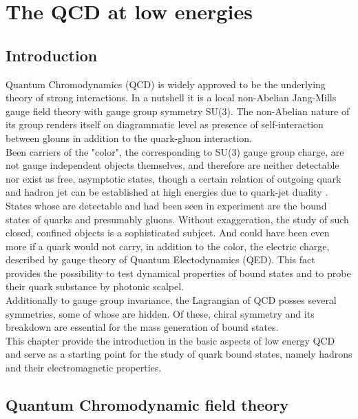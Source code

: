 \chapter{The QCD at low energies}
\label{chap:QCD_low}

\section{Introduction}
Quantum Chromodynamics (QCD) is widely approved to be the underlying theory of strong interactions. In a nutshell it is a local non-Abelian Jang-Mills gauge field theory with gauge group symmetry SU(3). The non-Abelian nature of its group renders itself on diagrammatic level as presence of self-interaction between glouns in addition to the quark-gluon interaction. 
\\
Been carriers of the "color", the corresponding to SU(3) gauge group charge, are not gauge independent objects themselves, and therefore are neither detectable nor exist as free, asymptotic states, though a certain relation of outgoing quark and hadron jet can be established at high energies due to quark-jet duality \cite{--}. States whose are detectable and had been seen in experiment are the bound states of quarks and presumably gluons. Without exaggeration, the study of such closed, confined objects is a sophisticated subject. And could have been even more if a quark would not carry, in addition to the color, the electric charge, described by gauge theory of Quantum Electodynamics (QED). This fact provides the possibility to test dynamical properties of bound states and to probe their quark substance by photonic scalpel. 
\\
Additionally to gauge group invariance, the Lagrangian of QCD posses several symmetries, some of whose are hidden. Of these, chiral symmetry and its breakdown are essential for the mass generation of bound states. 
\\
This chapter provide the introduction in the basic aspects of low energy QCD and serve as a starting point for the study of quark bound states, namely hadrons and their electromagnetic properties.



\section{Quantum Chromodynamic field theory}
